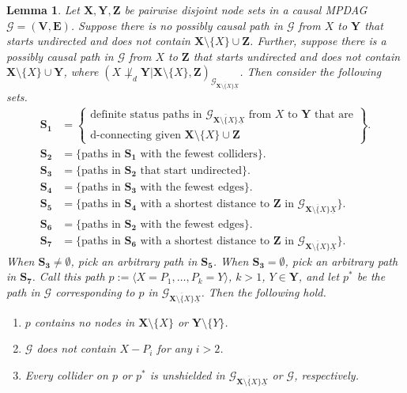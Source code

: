 \documentclass[11pt]{article}
\newtheorem{lemma}[theorem]{Lemma}
\newcommand{\mb}[1]{\mathbf{#1}}
\newcommand{\dsepp}{\perp_{d}}
\newcommand{\g}[1][G]{\mathcal{#1}}
\begin{document}
\begin{lemma}
\label{lem:unishielded-colliders}
    Let $\mb{X,Y,Z}$ be pairwise disjoint node sets in a causal MPDAG $\g = (\mb{V,E})$. Suppose there is no possibly causal path in $\g$ from $X$ to $\mb{Y}$ that starts undirected and does not contain $\mb{X} \setminus \{X\} \cup \mb{Z}$. Further, suppose there is a possibly causal path in $\g$ from $X$ to $\mb{Z}$ that starts undirected and does not contain $\mb{X} \setminus \{X\} \cup \mb{Y}$, where $(X \not \dsepp \mb{Y} | \mb{X} \setminus \{X\}, \mb{Z})_{\g_{\overline{\mb{X} \setminus \{X\}} \underline{X}}}$. Then consider the following sets.
    \begin{align*}
        \mb{S_1} &= \left\{\begin{array}{ll}
                                \text{definite status paths in $\g_{\overline{\mb{X} \setminus \{X\}} \underline{X}}$ from $X$ to $\mb{Y}$ that are} \\
                                \text{d-connecting given $\mb{X} \setminus \{X\} \cup \mb{Z}$}
                           \end{array}\right\}.\\
        \mb{S_2} &= \{ \text{paths in $\mb{S_1}$ with the fewest colliders} \}.\\[.4cm]
        \mb{S_3} &= \{ \text{paths in } \mb{S_2} \text{ that start undirected}\}.\\
        \mb{S_4} &= \{ \text{paths in $\mb{S_3}$ with the fewest edges} \}.\\
        \mb{S_5} &= \{ \text{paths in $\mb{S_4}$ with a shortest distance to $\mb{Z}$ in $\g_{\overline{\mb{X} \setminus \{X\}} \underline{X}}$} \}.\\[.4cm]
        \mb{S_6} &= \{ \text{paths in $\mb{S_2}$ with the fewest edges} \}.\\
        \mb{S_7} &= \{ \text{paths in $\mb{S_6}$ with a shortest distance to $\mb{Z}$ in $\g_{\overline{\mb{X} \setminus \{X\}} \underline{X}}$} \}.
    \end{align*}
    When $\mb{S_3} \neq \emptyset$, pick an arbitrary path in $\mb{S_5}$. When $\mb{S_3} = \emptyset$, pick an arbitrary path in $\mb{S_7}$. Call this path $p := \langle X = P_1, \dots, P_k = Y \rangle$, $k > 1$, $Y \in \mb{Y}$, and let $p^*$ be the path in $\g$ corresponding to $p$ in $\g_{\overline{\mb{X} \setminus \{X\}} \underline{X}}$. Then the following hold.
    \begin{enumerate}[label = (\roman*)]
        \item\label{unishielded-coll-case0} $p$ contains no nodes in $\mb{X} \setminus \{X\}$ or $\mb{Y} \setminus \{Y\}$.
        \item \label{unishielded-coll-case1} $\g$ does not contain $X - P_i$ for any $i > 2$.
        \item \label{unishielded-coll-case2} Every collider on $p$ or $p^*$ is unshielded in $\g_{\overline{\mb{X} \setminus \{X\}} \underline{X}}$ or $\g$, respectively. 
    \end{enumerate}
\end{lemma}
\end{document}
